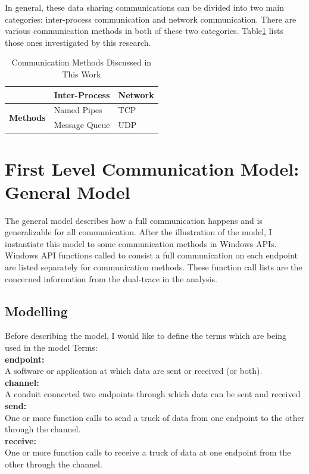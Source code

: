 In general, these data sharing communications can be divided into two main categories: inter-process communication and network communication. There are various communication methods in both of these two categories. Table\ref{methodsInCategories} lists those ones investigated by this research. 



\begin{table}[H]
\centering
\caption{Communication Methods Discussed in This Work}
\label{methodsInCategories}
\begin{tabular}{|l|l|l|}
 \hline
 &  \textbf{Inter-Process}& \textbf{Network}\\
 \hline
\multirow{2}{*}{{\textbf{Methods}}} & Named Pipes & TCP   \\
 \cline{2-3}
 & Message Queue &  UDP \\
 \hline
\end{tabular}
\end{table}


\section{First Level Communication Model: General Model}   
The general model describes how a full communication happens and is generalizable for all communication. After the illustration of the model, I instantiate this model to some communication methods in Windows APIs. Windows API functions called to consist a full communication on each endpoint are listed separately for communication methods. These function call lists are the concerned information from the dual-trace in the analysis.
\subsection{Modelling}
Before describing the model, I would like to define the terms which are being used in the model
Terms:\\
\textbf{endpoint:}\\
A software or application at which data are sent or received (or both).\\
\textbf{channel:}\\
A conduit connected two endpoints through  which data can be sent and received\\
\textbf{send:}\\
One or more function calls to send a truck of data from one endpoint to the other through  the channel.\\
\textbf{receive:}\\
One or more function calls to receive a truck of data at one endpoint from the other through the channel.\\

